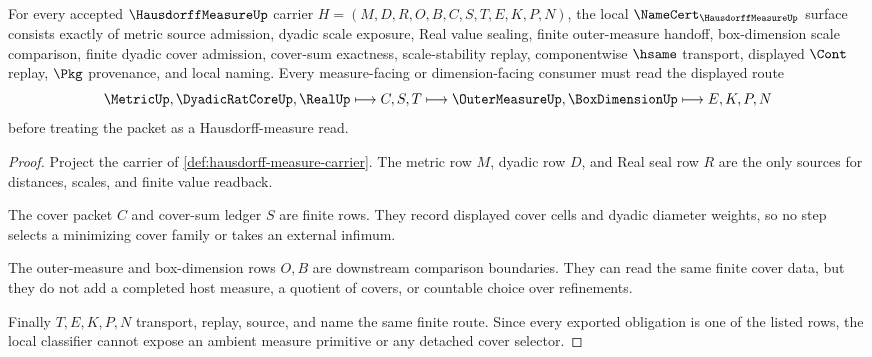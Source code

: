 \begin{theorem}
\label{thm:hausdorff-measure-namecert-obligations}
For every accepted $\HausdorffMeasureUp$ carrier $H=(M,D,R,O,B,C,S,T,E,K,P,N)$, the local $\NameCert_{\HausdorffMeasureUp}$ surface consists exactly of metric source admission, dyadic scale exposure, Real value sealing, finite outer-measure handoff, box-dimension scale comparison, finite dyadic cover admission, cover-sum exactness, scale-stability replay, componentwise $\hsame$ transport, displayed $\Cont$ replay, $\Pkg$ provenance, and local naming. Every measure-facing or dimension-facing consumer must read the displayed route
$$
\MetricUp,\DyadicRatCoreUp,\RealUp \longmapsto C,S,T \longmapsto \OuterMeasureUp,\BoxDimensionUp \longmapsto E,K,P,N
$$
before treating the packet as a Hausdorff-measure read.
\end{theorem}
\begin{proof}
Project the carrier of \autoref{def:hausdorff-measure-carrier}. The metric row $M$, dyadic row $D$, and Real seal row $R$ are the only sources for distances, scales, and finite value readback.

The cover packet $C$ and cover-sum ledger $S$ are finite rows. They record displayed cover cells and dyadic diameter weights, so no step selects a minimizing cover family or takes an external infimum.

The outer-measure and box-dimension rows $O,B$ are downstream comparison boundaries. They can read the same finite cover data, but they do not add a completed host measure, a quotient of covers, or countable choice over refinements.

Finally $T,E,K,P,N$ transport, replay, source, and name the same finite route. Since every exported obligation is one of the listed rows, the local classifier cannot expose an ambient measure primitive or any detached cover selector.
\end{proof}

